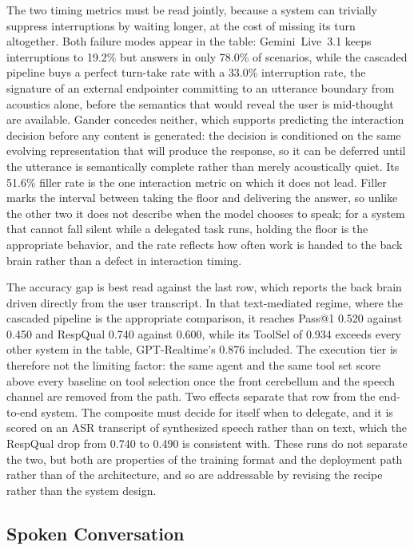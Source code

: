 The two timing metrics must be read jointly, because a system can trivially suppress
interruptions by waiting longer, at the cost of missing its turn altogether. Both failure modes
appear in the table: Gemini~Live~3.1 keeps interruptions to 19.2\% but answers in only 78.0\% of
scenarios, while the cascaded pipeline buys a perfect turn-take rate with a 33.0\% interruption
rate, the signature of an external endpointer committing to an utterance boundary from acoustics
alone, before the semantics that would reveal the user is mid-thought are available. Gander
concedes neither, which supports predicting the interaction decision before any content is
generated: the decision is conditioned on the same evolving representation that will produce the
response, so it can be deferred until the utterance is semantically complete rather than merely
acoustically quiet. Its 51.6\% filler rate is the one interaction metric on which it does not
lead. Filler marks the interval between taking the floor and delivering the answer, so unlike the
other two it does not describe when the model chooses to speak; for a system that cannot fall
silent while a delegated task runs, holding the floor is the appropriate behavior, and the rate
reflects how often work is handed to the back brain rather than a defect in interaction timing.

The accuracy gap is best read against the last row, which reports the back brain driven directly
from the user transcript. In that text-mediated regime, where the cascaded pipeline is the
appropriate comparison, it reaches Pass@1 0.520 against 0.450 and RespQual 0.740 against 0.600,
while its ToolSel of 0.934 exceeds every other system in the table, GPT-Realtime's 0.876
included. The execution tier is therefore not the limiting factor: the same agent and the same
tool set score above every baseline on tool selection once the front cerebellum and the speech
channel are removed from the path. Two effects separate that row from the end-to-end system.
The composite must decide for itself when to delegate, and it is scored on an ASR transcript of
synthesized speech rather than on text, which the RespQual drop from 0.740 to 0.490 is consistent
with. These runs do not separate the two, but both are properties of the training format and the
deployment path rather than of the architecture, and so are addressable by revising the recipe
rather than the system design.

\subsection{Spoken Conversation}
\label{sec:result_voicechat}


